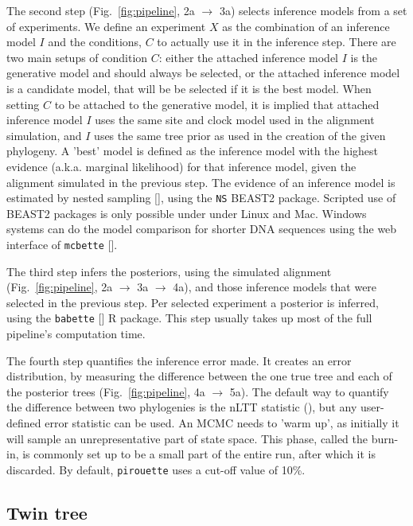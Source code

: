 \documentclass{article}
\begin{document}
The second step (Fig.~\ref{fig:pipeline}, 2a $\rightarrow$ 3a)
selects inference models from a set of experiments. 
We define an experiment $X$ as the combination of an inference model $I$
and the conditions, $C$ to actually use it in the inference step.
There are two main setups of condition $C$: either the attached
inference model $I$ is the generative model and should always be selected,
or the attached inference model is a candidate model, that will be
be selected if it is the best model.
When setting $C$ to be attached to the generative model,
it is implied that attached inference model $I$ uses the 
same site and clock model used in the alignment simulation,
and $I$ uses the same tree prior as used in the creation of the given phylogeny. 
A 'best' model is defined as the inference model with
the highest evidence (a.k.a. marginal likelihood) for that inference model, 
given the alignment simulated in the previous step.
The evidence of an inference model is estimated by nested 
sampling [\cite{maturana2018model}], using the \verb;NS; BEAST2 package.
Scripted use of BEAST2 packages is only possible under under Linux and Mac.
Windows systems can do the model comparison for shorter DNA sequences
using the web interface of \verb;mcbette; [\cite{mcbette}].

The third step infers the posteriors,
using the simulated alignment (Fig.~\ref{fig:pipeline}, 2a $\rightarrow$ 3a $\rightarrow$ 4a),
and those inference models that were selected in the previous step. 
Per selected experiment a posterior is inferred, using the 
\verb;babette; [\cite{bilderbeek2018babette}] R package. 
This step usually takes up most of the full pipeline's computation time.

The fourth step quantifies the inference error made.
It creates an error distribution, by measuring the difference
between the one true tree and each of the posterior 
trees (Fig.~\ref{fig:pipeline}, 4a $\rightarrow$ 5a).
The default way to quantify the difference between two phylogenies
is the nLTT statistic (\cite{janzen2015approximate}), but any 
user-defined error statistic can be used.
An MCMC needs to 'warm up', as initially it will sample
an unrepresentative part of state space. This phase, called 
the burn-in, is commonly set up to be a small part of the entire run, 
after which it is discarded. By default, \verb;pirouette; 
uses a cut-off value of 10\%.

\subsection{Twin tree}\label{subsec:twinning}
\end{document}
